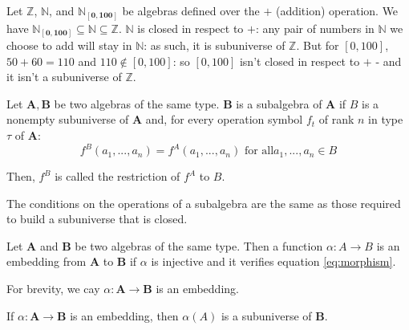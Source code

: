 \begin{example} Let $\boldsymbol{\mathbb{Z}}$, $\boldsymbol{\mathbb{N}}$, and
$\boldsymbol{\mathbb{N}_{[0,100]}}$ be algebras defined over the $+$ (addition)
operation. We have $\boldsymbol{\mathbb{N}_{[0,100]}} \subseteq
\boldsymbol{\mathbb{N}} \subseteq \boldsymbol{\mathbb{Z}}$.  $\mathbb{N}$ is
closed in respect to $+$: any pair of numbers in $\mathbb{N}$ we choose to add
will stay in $\mathbb{N}$: as such, it is subuniverse of
$\boldsymbol{\mathbb{Z}}$. But for $[0,100]$, $50 + 60 = 110$ and $110 \notin
[0,100]$: so $[0,100]$ isn't closed in respect to $+$ - and it isn't a
subuniverse of $\boldsymbol{\mathbb{Z}}$.
\end{example}

\begin{definition}[subalgebra] Let $\boldsymbol{A},\boldsymbol{B}$ be two
algebras of the same type. $\boldsymbol{B}$ is a subalgebra of $\boldsymbol{A}$
if $B$ is a nonempty subuniverse of $\boldsymbol{A}$ and, for every operation
symbol $f_t$ of rank $n$ in type $\tau$ of $\boldsymbol{A}$:
  \begin{equation}
    \label{eq:subalgebra} f^{B}(a_1,...,a_n) = f^{A}(a_1,...,a_n) \text{ for all
} a_1,...,a_n \in B
  \end{equation}

  Then, $f^{B}$ is called the restriction of $f^{A}$ to $B$.
\end{definition}

\begin{remark} The conditions on the operations of a subalgebra are the same as
those required to build a subuniverse that is closed.
\end{remark}

\begin{definition}[embedding]  Let $\boldsymbol{A}$ and $\boldsymbol{B}$ be
two algebras of the same type. Then a function $\alpha: A \rightarrow B$ is an
embedding from $\boldsymbol{A}$ to $\boldsymbol{B}$ if $\alpha$ is injective and
it verifies equation \ref{eq:morphism}.
\end{definition}

\begin{remark}  For brevity, we cay $\alpha: \boldsymbol{A} \rightarrow
\boldsymbol{B}$ is an embedding.
\end{remark}

\begin{theorem}  If $\alpha: \boldsymbol{A} \rightarrow \boldsymbol{B}$ is an
embedding, then $\alpha(A)$ is a subuniverse of $\boldsymbol{B}$.
\end{theorem}

